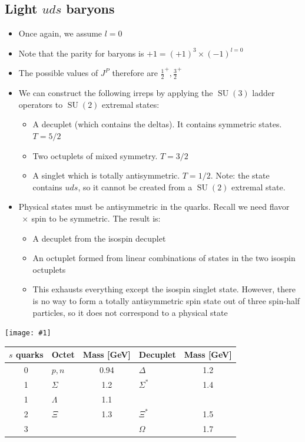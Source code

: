 \documentclass[11pt]{article}
\DeclareMathOperator{\SU}{SU}
\newcommand{\embedimgw}[2]{\begin{center}\texttt{[image: \#1]}\end{center}}
\begin{document}
\subsection{Light $uds$ baryons}
\begin{itemize}
  \item Once again, we assume $l=0$
  \item Note that the parity for baryons is $+1 = (+1)^3\times (-1)^{l=0}$
  \item The possible values of $J^P$ therefore are $\frac{1}{2}^+, \frac{3}{2}^+$
  \item We can construct the following irreps by applying the $\SU(3)$ ladder operators to $\SU(2)$ extremal states:
  \begin{itemize}
    \item A decuplet (which contains the deltas). It contains symmetric states. $T = 5/2$
    \item Two octuplets of mixed symmetry. $T = 3/2$
    \item A singlet which is totally antisymmetric. $T = 1/2$. Note: the state contains $uds$, so it cannot be created from a $\SU(2)$ extremal state. 
  \end{itemize}
  \item Physical states must be antisymmetric in the quarks. Recall we need flavor$~\times~$spin to be symmetric. The result is:
  \begin{itemize}
    \item A decuplet from the isospin decuplet
    \item An octuplet formed from linear combinations of states in the two isospin octuplets
    \item This exhausts everything except the isospin singlet state. However, there is no way to form a totally antisymmetric spin state out of three spin-half particles, so it does not correspond to a physical state
  \end{itemize}
\end{itemize}
  \embedimgw{figs/baryons_uds.png}{.6}
  \begin{center}\begin{tabular}{c|lc|lc}
  $s$ quarks & Octet & Mass [GeV] & Decuplet & Mass [GeV]\\\hline
  0 & $p,n$ & 0.94 & $\Delta$ & 1.2\\
  1 & $\Sigma$ & 1.2 & $\Sigma^*$ & 1.4\\
  1 & $\Lambda$ & 1.1 \\
  2 & $\Xi$ & 1.3 & $\Xi^*$ & 1.5 \\
  3 &&& $\Omega$ & 1.7
  \end{tabular}\end{center}
\end{document}
